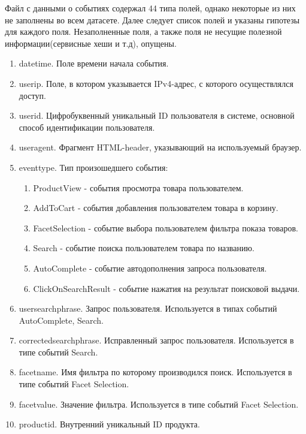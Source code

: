 \documentclass[14pt]{mmcs_article}
\newenvironment{myenumerate}
{ \begin{enumerate}
		\setlength{\itemsep}{0pt}
		\setlength{\parskip}{0pt}
		\setlength{\parsep}{0pt}     }
	{ \end{enumerate}                  }
\begin{document}
Файл с данными о событиях содержал 44 типа полей, однако некоторые из них не заполнены во всем датасете. Далее следует список полей и указаны гипотезы для каждого поля. Незаполненные поля, а также поля не несущие полезной информации(сервисные хеши и т.д), опущены.
\begin{myenumerate}
	\item datetime. Поле времени начала события. 
	\item userip. Поле, в котором указывается IPv4-адрес, с которого осуществлялся доступ.
	\item userid. Цифробуквенный уникальный ID пользователя в системе, основной способ идентификации пользователя.
	\item useragent. Фрагмент HTML-header, указывающий на используемый браузер. 
	\item eventtype. Тип произошедшего события: 
	\begin{myenumerate}
		\item ProductView - события просмотра товара пользователем. 
		\item AddToCart - события добавления пользователем товара в корзину. 
		\item FacetSelection - событие выбора пользователем фильтра показа товаров.  
		\item Search - событие поиска пользователем товара по названию.
		\item AutoComplete - событие автодополнения запроса пользователя. 
		\item ClickOnSearchResult - событие нажатия на результат поисковой выдачи. 
	\end{myenumerate}
	\item usersearchphrase. Запрос пользователя. Используется в типах событий AutoComplete, Search.
	\item correctedsearchphrase. Исправленный запрос пользователя. Используется в типе событий Search. 
	\item facetname. Имя фильтра по которому производился поиск. Используется в типе событий Facet Selection. 
	\item facetvalue. Значение фильтра. Используется в типе событий Facet Selection.  
	\item productid. Внутренний уникальный ID продукта. 
\end{myenumerate}
\end{document}
